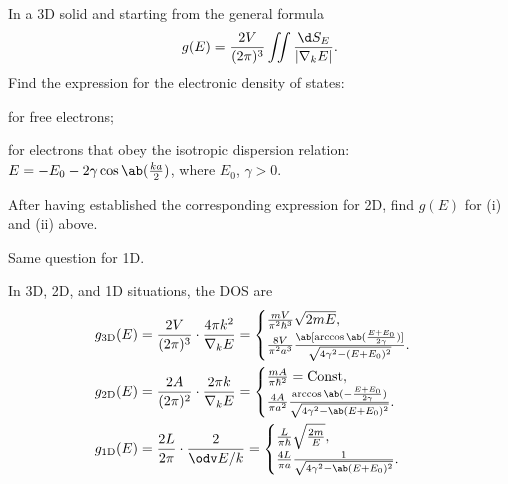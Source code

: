 \begin{problem}\leavevmode
  \begin{enumext}[label = (\alph*)]
    \item In a 3D solid and starting from the general formula
    \[
      g(E) = \frac{2V}{(2\pi)^3} \iint \frac{\d S_E}{|\nabla_kE|}.
    \]
    Find the expression for the electronic density of states:
    \begin{enumerate*}[label = (\roman*)]
      \item for free electrons;
      \item for electrons that obey the isotropic dispersion relation:
      $E = -E_0 - 2\gamma \cos\ab(\frac{ka}{2})$, where $E_0$, $\gamma > 0$.
    \end{enumerate*}
    \item After having established the corresponding expression for 2D,
    find $g(E)$ for (i) and (ii) above.
    \item Same question for 1D.
  \end{enumext}
\end{problem}
\begin{solution}
  In 3D, 2D, and 1D situations, the DOS are
  \begin{align*}
    g_\text{3D}(E) & = \frac{2V}{(2\pi)^3} \cdot \frac{4\pi k^2}{\nabla_kE}
  = \begin{cases}
      \frac{mV}{\pi^2\hbar^3}\sqrt{2mE},\\
      \frac{8V}{\pi^2a^3} \frac{\ab[\arccos\ab(\frac{E + E_0}{2\gamma})]}
        {\sqrt{4\gamma^2 - (E + E_0)^2}}.
    \end{cases}\\
    g_\text{2D}(E) & = \frac{2A}{(2\pi)^2} \cdot \frac{2\pi k}{\nabla_kE}
  = \begin{cases}
      \frac{mA}{\pi\hbar^2} = \text{Const},\\
      \frac{4A}{\pi a^2} \frac{\arccos\ab(-\frac{E+E_0}{2\gamma})}
        {\sqrt{4\gamma^2 - \ab(E + E_0)^2}}.
    \end{cases}\\
    g_\text{1D}(E) & = \frac{2L}{2\pi} \cdot \frac{2}{\odv E/k}
  = \begin{cases}
      \frac L{\pi\hbar} \sqrt{\frac{2m}{E}},\\
      \frac{4L}{\pi a} \frac{1}{\sqrt{4\gamma^2 - \ab(E + E_0)^2}}.
    \end{cases}
  \end{align*}
\end{solution}